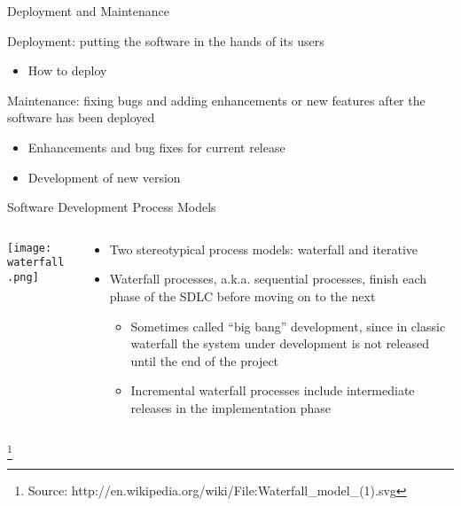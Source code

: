 \documentclass{beamer}
\begin{document}
\begin{frame}[fragile]{Deployment and Maintenance}


Deployment: putting the software in the hands of its users
\begin{itemize}
\item How to deploy
\end{itemize}

Maintenance: fixing bugs and adding enhancements or new features after the software has been deployed
\begin{itemize}
\item Enhancements and bug fixes for current release
\item Development of new version
\end{itemize}


\end{frame}

\begin{frame}[fragile]{Software Development Process Models}


\begin{columns}[c]
\begin{column}{1.8in}
\begin{center}
\texttt{[image: waterfall.png]}
\end{center}
\end{column}
\begin{column}{3.1in}
\begin{itemize}
\item Two stereotypical process models: waterfall and iterative
\item Waterfall processes, a.k.a. sequential processes, finish each phase of the SDLC before moving on to the next
\begin{itemize}
\item Sometimes called ``big bang'' development, since in classic waterfall the system under development is not released until the end of the project
\item Incremental waterfall processes include intermediate releases in the implementation phase
\end{itemize}
\end{itemize}
\end{column}
\end{columns}
\footnote{Source: http://en.wikipedia.org/wiki/File:Waterfall\_model\_(1).svg}

\end{frame}
\end{document}
